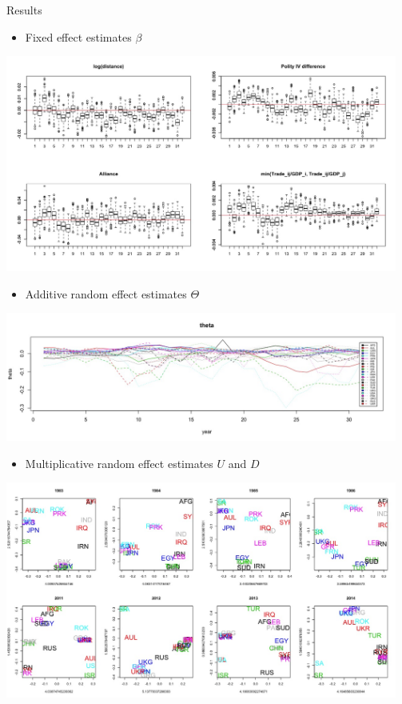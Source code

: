 \documentclass[serif,mathserif,final,table]{beamer}
\begin{document}
\begin{frame}{}
\begin{columns}[t]
\begin{column}{0.235\linewidth}
\begin{block}{Results}
		\begin{itemize}
            \item Fixed effect estimates $\beta$	\end{itemize}
             \includegraphics[width=0.967\textwidth]{betaplot.jpeg}		\begin{itemize}
            \item Additive random effect estimates $\Theta$	\end{itemize}
             \includegraphics[width=0.967\textwidth]{thetaplot.jpeg}		\begin{itemize}
            \item Multiplicative random effect estimates $U$ and $D$
            		\end{itemize}
               \includegraphics[width=0.967\textwidth]{UDUplot.jpeg}



\end{block}
\end{column}
\end{columns}
\end{frame}
\end{document}
